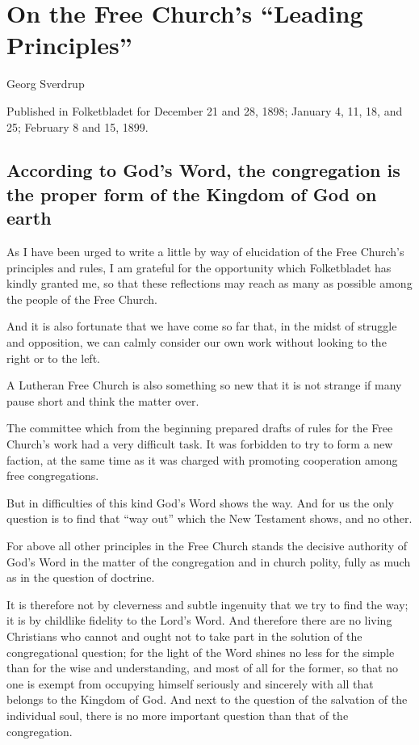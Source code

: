 
\section{On the Free Church’s “Leading Principles”}

Georg Sverdrup

Published in Folketbladet for December 21 and 28, 1898; January 4, 11, 18, and 25; February 8 and 15, 1899.

\subsection{According to God’s Word, the congregation is the proper form of the Kingdom of God on earth}

As I have been urged to write a little by way of elucidation of the Free Church’s principles and rules, I am grateful for the opportunity which Folketbladet has kindly granted me, so that these reflections may reach as many as possible among the people of the Free Church.

And it is also fortunate that we have come so far that, in the midst of struggle and opposition, we can calmly consider our own work without looking to the right or to the left.

A Lutheran Free Church is also something so new that it is not strange if many pause short and think the matter over.

The committee which from the beginning prepared drafts of rules for the Free Church’s work had a very difficult task. It was forbidden to try to form a new faction, at the same time as it was charged with promoting cooperation among free congregations.

But in difficulties of this kind God’s Word shows the way. And for us the only question is to find that “way out” which the New Testament shows, and no other.

For above all other principles in the Free Church stands the decisive authority of God’s Word in the matter of the congregation and in church polity, fully as much as in the question of doctrine.

It is therefore not by cleverness and subtle ingenuity that we try to find the way; it is by childlike fidelity to the Lord’s Word. And therefore there are no living Christians who cannot and ought not to take part in the solution of the congregational question; for the light of the Word shines no less for the simple than for the wise and understanding, and most of all for the former, so that no one is exempt from occupying himself seriously and sincerely with all that belongs to the Kingdom of God. And next to the question of the salvation of the individual soul, there is no more important question than that of the congregation.

